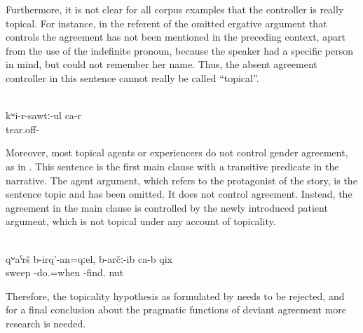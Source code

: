 Furthermore, it is not clear for all corpus examples that the controller is really topical. For instance, in  the referent of the omitted ergative argument that controls the agreement has not been mentioned in the preceding context, apart from the use of the indefinite pronoun, because the speaker had a specific person in mind, but could not remember her name. Thus, the absent agreement controller in this sentence cannot really be called ``topical''.
%
\begin{exe}
	\ex	{[To someone (= a woman whose name the speaker forgot) I said, well I will wash (my legs)]}\\	\label{ex:‎‎She takes (the jug) out of my hands (and washes my legs)}
	\gll	kʷi-r-sawtː-ul	ca-r\\
		tear.off-	\\
	\glt	{}
\end{exe}

Moreover, most topical agents or experiencers do not control gender agreement, as in . This sentence is the first main clause with a transitive predicate in the narrative. The agent argument, which refers to the protagonist of the story, is the sentence topic and has been omitted. It does not control agreement. Instead, the agreement in the main clause is controlled by the newly introduced patient argument, which is not topical under any account of topicality.

\begin{exe}
	 \\ \label{ex:When she was sweeping, she found a walnut.} 
	\gll	qʷaˁrš	b-irq'-an=qːel,	b-arčː-ib	ca-b	qix\\
		sweep	-do.=when	-find.		nut\\
	\glt	{}
\end{exe}

Therefore, the topicality hypothesis as formulated by \citet{Sumbatova.Lander2014} needs to be rejected, and for a final conclusion about the pragmatic functions of deviant agreement more research is needed.

